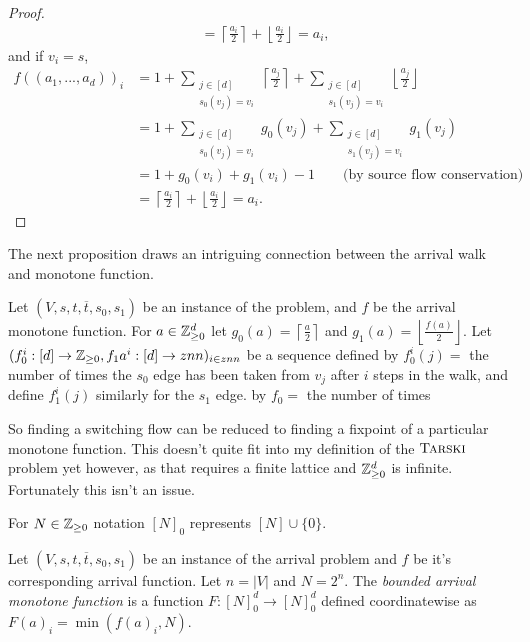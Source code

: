 \begin{proof}
\begin{align*}
      &= \left\lceil \frac{a_i}{2} \right\rceil + \left\lfloor \frac{a_i}{2} \right\rfloor = a_i,
    \end{align*}
    and if $v_i = s$,
    \begin{align*}
      f((a_1, ..., a_d))_i &= 
    1 + \sum_{\substack{j \in [d] \\ s_0(v_j) = v_i}} \left\lceil \frac{a_j}{2} \right\rceil
      + \sum_{\substack{j \in [d] \\ s_1(v_j) = v_i}} \left\lfloor \frac{a_j}{2} \right\rfloor \\
      &= 1 + \sum_{\substack{j \in [d] \\ s_0(v_j) = v_i}}  g_0(v_j) 
      + \sum_{\substack{j \in [d] \\ s_1(v_j) = v_i}}  g_1(v_j) \\
      &= 1 + g_0(v_i) + g_1(v_i) - 1 \qquad \text{(by source flow conservation)} \\
      &= \left\lceil \frac{a_i}{2} \right\rceil + \left\lfloor \frac{a_i}{2} \right\rfloor = a_i.
    \end{align*}
  \end{proof}
  The next proposition draws an intriguing connection between the arrival walk and monotone function.
  \newcommand{\lc}{\left\lceil}
  \newcommand{\rc}{\right\rceil}
  \newcommand{\lf}{\left\lfloor}
  \newcommand{\rf}{\right\rfloor}
  \begin{prop}
    Let $(V, s, t, \overline{t}, s_0, s_1)$ be an instance of the problem, and $f$ be the 
    arrival monotone function. For $a \in \mathbb{Z}_{\geq 0}^d$ let $g_0(a) = \lc \frac{a}{2} \rc$ and 
    $g_1(a) = \lf \frac{f(a)}{2} \rf$. Let 
    $(f_0^i : [d] \to \mathbb{Z}_{\geq 0}, f_1a^i : [d] \to znn)_{i \in znn}$
    be a sequence defined by $f_0^i(j) = $ the number of times the $s_0$ edge has been taken from $v_j$
    after $i$ steps in the walk, and define $f_1^i(j)$ similarly for the $s_1$ edge.
    by $f_0 = $ the number of times 
  \end{prop}
  So finding a switching flow can be reduced to finding a fixpoint of a particular monotone function.
  This doesn't quite fit into my definition of the $\textsc{Tarski}$ problem yet however, as that requires a finite
  lattice and $\mathbb{Z}_{\geq 0}^d$ is infinite. Fortunately this isn't an issue.
  \begin{notation}
    For $N \in \mathbb{Z}_{\geq 0}$ notation $[N]_0$ represents $[N] \cup \{0\}$.
  \end{notation}
  \newcommand{\no}{[N]_0}
  \begin{definition}
    Let $(V, s, t, \overline{t}, s_0, s_1)$ be an instance of the arrival problem and $f$
    be it's corresponding arrival function. Let $n = |V|$ and $N = 2^n$. The \emph{bounded arrival monotone function}
    is a function $F : \no^d \to \no^d$ defined coordinatewise as $F(a)_i = \min(f(a)_i, N)$. 
  \end{definition}
